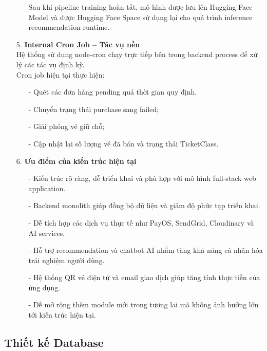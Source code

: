 \begin{itemize}
\begin{itemize}
        Sau khi pipeline training hoàn tất, mô hình được lưu lên Hugging Face Model và được Hugging Face Space sử dụng lại cho quá trình inference recommendation runtime.
    \end{itemize}
    \item[5.] \textbf{Internal Cron Job – Tác vụ nền}\\
    Hệ thống sử dụng node-cron chạy trực tiếp bên trong backend process để xử lý các tác vụ định kỳ.\\
    Cron job hiện tại thực hiện:
    \begin{itemize}
        \item[-] Quét các đơn hàng pending quá thời gian quy định.
        \item[-] Chuyển trạng thái purchase sang failed;
        \item[-] Giải phóng vé giữ chỗ;
        \item[-] Cập nhật lại số lượng vé đã bán và trạng thái TicketClass.
    \end{itemize}
    \item[6.] \textbf{Ưu điểm của kiến trúc hiện tại}
    \begin{itemize}
        \item[-] Kiến trúc rõ ràng, dễ triển khai và phù hợp với mô hình full-stack web application.
        \item[-] Backend monolith giúp đồng bộ dữ liệu và giảm độ phức tạp triển khai.
        \item[-] Dễ tích hợp các dịch vụ thực tế như PayOS, SendGrid, Cloudinary và AI services.
        \item[-] Hỗ trợ recommendation và chatbot AI nhằm tăng khả năng cá nhân hóa trải nghiệm người dùng.
        \item[-] Hệ thống QR vé điện tử và email giao dịch giúp tăng tính thực tiễn của ứng dụng.
        \item[-] Dễ mở rộng thêm module mới trong tương lai mà không ảnh hưởng lớn tới kiến trúc hiện tại.
    \end{itemize}
\end{itemize}

\subsection{Thiết kế Database}

